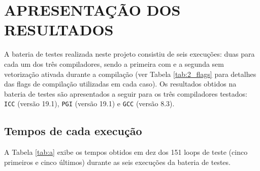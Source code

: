 
\chapter{APRESENTAÇÃO DOS RESULTADOS}
\label{chp:1}

A bateria de testes realizada neste projeto consistiu de seis execuções: duas para cada um dos três compiladores, sendo a primeira com e a segunda sem vetorização ativada durante a compilação (ver Tabela \ref{tab:2_flags} para detalhes das flags de compilação utilizadas em cada caso). Os resultados obtidos na bateria de testes são apresentados a seguir para os três compiladores testados: \texttt{ICC} (versão 19.1), \texttt{PGI} (versão 19.1) e \texttt{GCC} (versão 8.3).

\section{Tempos de cada execução}

A Tabela \ref{tab:a} exibe os tempos obtidos em dez dos 151 loops de teste (cinco primeiros e cinco últimos) durante as seis execuções da bateria de testes.

